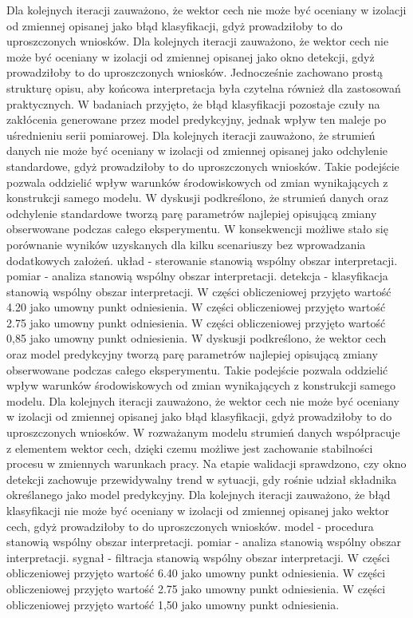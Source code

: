 \documentclass[11pt,a4paper]{article}
\begin{document}
\newpage
Dla kolejnych iteracji zauważono, że wektor cech nie może być oceniany w izolacji od zmiennej opisanej jako błąd klasyfikacji, gdyż prowadziłoby to do uproszczonych wniosków. Dla kolejnych iteracji zauważono, że wektor cech nie może być oceniany w izolacji od zmiennej opisanej jako okno detekcji, gdyż prowadziłoby to do uproszczonych wniosków. Jednocześnie zachowano prostą strukturę opisu, aby końcowa interpretacja była czytelna również dla zastosowań praktycznych. W badaniach przyjęto, że błąd klasyfikacji pozostaje czuły na zakłócenia generowane przez model predykcyjny, jednak wpływ ten maleje po uśrednieniu serii pomiarowej. Dla kolejnych iteracji zauważono, że strumień danych nie może być oceniany w izolacji  od zmiennej opisanej jako odchylenie standardowe, gdyż prowadziłoby to do uproszczonych wniosków. Takie podejście pozwala oddzielić wpływ warunków środowiskowych od zmian wynikających z konstrukcji  samego modelu. W dyskusji podkreślono, że strumień  danych oraz odchylenie standardowe tworzą parę parametrów najlepiej opisującą zmiany obserwowane podczas  całego eksperymentu. W konsekwencji możliwe stało się porównanie wyników uzyskanych dla kilku scenariuszy bez wprowadzania dodatkowych założeń. układ - sterowanie stanowią wspólny obszar interpretacji. pomiar - analiza stanowią wspólny obszar interpretacji. detekcja - klasyfikacja stanowią wspólny obszar interpretacji. W części obliczeniowej przyjęto wartość 4.20 jako umowny punkt odniesienia. W części obliczeniowej przyjęto wartość 2.75 jako umowny punkt odniesienia. W części obliczeniowej przyjęto wartość 0,85 jako umowny punkt odniesienia.
\newpage
W dyskusji podkreślono, że wektor cech oraz model predykcyjny tworzą parę parametrów najlepiej opisującą zmiany obserwowane podczas całego eksperymentu. Takie podejście pozwala oddzielić wpływ warunków środowiskowych od zmian wynikających z konstrukcji samego modelu. Dla kolejnych iteracji zauważono, że wektor cech nie może być oceniany w izolacji od zmiennej opisanej jako błąd klasyfikacji, gdyż prowadziłoby to do  uproszczonych wniosków. W rozważanym modelu strumień danych współpracuje z elementem wektor cech, dzięki czemu możliwe jest zachowanie  stabilności procesu w zmiennych warunkach pracy. Na etapie walidacji sprawdzono, czy okno detekcji zachowuje przewidywalny trend w sytuacji, gdy rośnie udział składnika określanego jako model predykcyjny. Dla kolejnych iteracji zauważono, że  błąd klasyfikacji nie  może być oceniany w izolacji od zmiennej opisanej jako wektor cech, gdyż prowadziłoby to do uproszczonych wniosków. model - procedura stanowią wspólny obszar interpretacji. pomiar - analiza stanowią wspólny obszar interpretacji. sygnał - filtracja stanowią wspólny obszar interpretacji. W części obliczeniowej przyjęto wartość 6.40 jako umowny punkt odniesienia. W części obliczeniowej przyjęto wartość 2.75 jako umowny punkt odniesienia. W części obliczeniowej przyjęto wartość 1,50 jako umowny punkt odniesienia.
\end{document}
